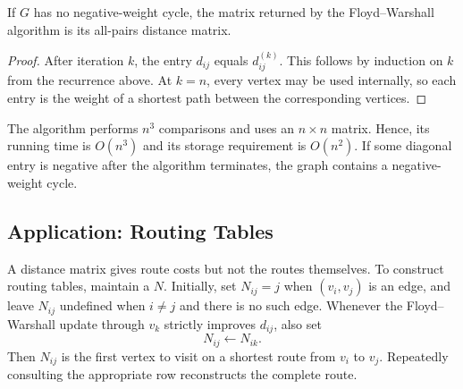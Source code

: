 \begin{Theorem}
If $G$ has no negative-weight cycle, the matrix returned by the Floyd--Warshall algorithm is its all-pairs distance matrix.
\end{Theorem}

\begin{proof}
After iteration $k$, the entry $d_{ij}$ equals $d_{ij}^{(k)}$. This follows by induction on $k$ from the recurrence above. At $k=n$, every vertex may be used internally, so each entry is the weight of a shortest path between the corresponding vertices.
\end{proof}

The algorithm performs $n^3$ comparisons and uses an $n\times n$ matrix. Hence, its running time is $O(n^3)$ and its storage requirement is $O(n^2)$. If some diagonal entry is negative after the algorithm terminates, the graph contains a negative-weight cycle.

\subsection{Application: Routing Tables}\label{subsec:RoutingTables}

A distance matrix gives route costs but not the routes themselves. To construct routing tables, maintain a  $N$. Initially, set $N_{ij}=j$ when $(v_i,v_j)$ is an edge, and leave $N_{ij}$ undefined when $i\ne j$ and there is no such edge. Whenever the Floyd--Warshall update through $v_k$ strictly improves $d_{ij}$, also set
\begin{equation*}
    N_{ij}\gets N_{ik}.
\end{equation*}
Then $N_{ij}$ is the first vertex to visit on a shortest route from $v_i$ to $v_j$. Repeatedly consulting the appropriate row reconstructs the complete route.

